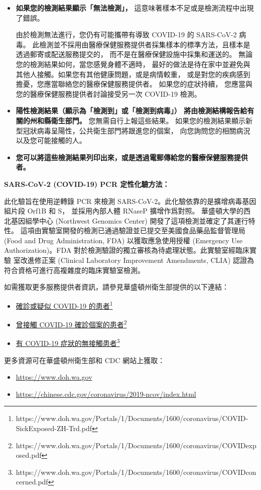 \documentclass[10pt]{article}
\newcommand{\link}[2]{\href{#1}{#2}\footnote{#1}}
\begin{document}
\begin{itemize}
\item

  \textbf{如果您的檢測結果顯示「無法檢測」，} 這意味著樣本不足或是檢測流程中出現了錯誤。

  由於檢測無法進行，您仍有可能攜帶有導致 COVID-19 的 SARS-CoV-2 病毒。
  此檢測並不採用由醫療保健服務提供者採集樣本的標準方法，且樣本是透過郵寄或配送服務提交的，
  而不是在醫療保健設施中採集和運送的。 無論您的檢測結果如何，當您感覺身體不適時，
  最好的做法是待在家中並避免與其他人接觸。如果您有其他健康問題，或是病情較重，
  或是對您的疾病感到擔憂，您應當聯絡您的醫療保健服務提供者。 如果您的症狀持續，
  您應當與您的醫療保健服務提供者討論接受另一次 COVID-19 檢測。

\item

  \textbf{陽性檢測結果（顯示為「檢測到」或「檢測到病毒」）
  將由檢測結構報告給有關的州和縣衛生部門。} 您無需自行上報這些結果。
  如果您的檢測結果顯示新型冠狀病毒呈陽性，公共衛生部門將跟進您的個案，
  向您詢問您的相關病況以及您可能接觸的人。

\item

  \textbf{您可以將這些檢測結果列印出來，或是透過電郵傳給您的醫療保健服務提供者。}

\end{itemize}

\bigskip
\textbf{SARS-CoV-2 (COVID-19) PCR 定性化驗方法：}

此化驗旨在使用逆轉錄 PCR 來檢測 SARS-CoV-2。此化驗依靠的是擴增病毒基因組片段 Orf1B 和 S，
並採用內部人體 RNaseP 擴增作爲對照。 華盛頓大學的西北基因組學中心 (Northwest Genomics
Center) 開發了這項檢測並確定了其運行特性。
這項由實驗室開發的檢測已通過驗證並已提交至美國食品藥品監督管理局 (Food and Drug
Administration, FDA) 以獲取應急使用授權 (Emergency Use Authorization)。FDA
對於檢測驗證的獨立審核為待處理狀態。此實驗室經臨床實驗 室改進修正案 (Clinical Laboratory
Improvement Amendments, CLIA) 認證為符合資格可進行高複雜度的臨床實驗室檢測。

如需獲取更多服務提供者資訊，請參見華盛頓州衛生部提供的以下連結：

\begin{itemize}
\item

  \link{https://www.doh.wa.gov/Portals/1/Documents/1600/coronavirus/COVID-SickExposed-ZH-Trd.pdf}{確診或疑似
  COVID-19 的患者}

\item

  \link{https://www.doh.wa.gov/Portals/1/Documents/1600/coronavirus/COVIDexposed.pdf}{曾接觸
  COVID-19 確診個案的患者}

\item

  \link{https://www.doh.wa.gov/Portals/1/Documents/1600/coronavirus/COVIDconcerned.pdf}{有
  COVID-19 症狀的無接觸患者}

\end{itemize}

更多資源可在華盛頓州衛生部和 CDC 網站上獲取：

\begin{itemize}
\item

  \url{https://www.doh.wa.gov}

\item

  \url{https://chinese.cdc.gov/coronavirus/2019-ncov/index.html}

\end{itemize}
\end{document}
